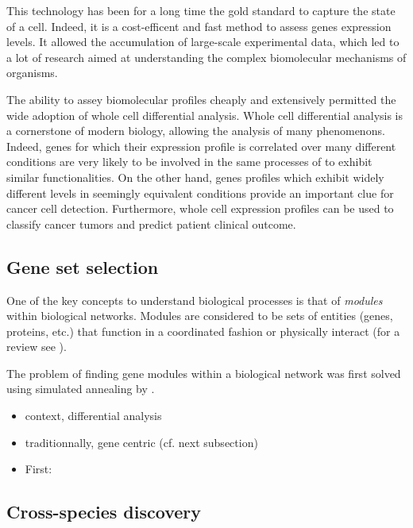 	This technology has been for a long time the gold standard to capture the state of a cell.
	Indeed, it is a cost-efficent and fast method to assess genes expression levels.
	It allowed the accumulation of large-scale experimental data, which led to a lot of research aimed at understanding the complex biomolecular mechanisms of organisms.

	The ability to assey biomolecular profiles cheaply and extensively permitted the wide adoption of whole cell differential analysis.
	Whole cell differential analysis is a cornerstone of modern biology, allowing the analysis of many phenomenons.
	Indeed, genes for which their expression profile is correlated over many different conditions are very likely to be involved in the same processes of to exhibit similar functionalities.
	On the other hand, genes profiles which exhibit widely different levels in seemingly equivalent conditions provide an important clue for cancer cell detection.
	Furthermore, whole cell expression profiles can be used to classify cancer tumors and predict patient clinical outcome.

	\subsection{Gene set selection}

	One of the key concepts to understand biological processes is that of \emph{modules} within biological networks.
	Modules are considered to be sets of entities (genes, proteins, etc.) that function in a coordinated fashion or physically interact (for a review see \textcite{mitra2013integrative}).

	The problem of finding gene modules within a biological network was first solved using simulated annealing by \textcite{ideker2002discovering}.

	\begin{itemize}
		\item context, differential analysis
		\item traditionnally, gene centric (cf. next subsection)
	\end{itemize}

	\begin{itemize}
		\item First: \cite{golub1999molecular}
	\end{itemize}

	\subsection{Cross-species discovery}

